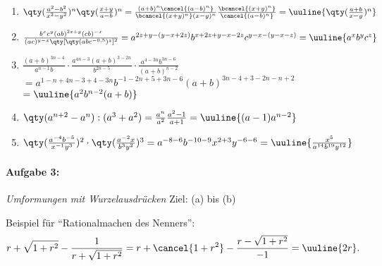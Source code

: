 \begin{enumerate}[label=(\alph*)]
    \item $\qty(\frac{a^2-b^2}{x^2-y^2})^n\qty(\frac{x+y}{a-b})^n = \frac{(a+b)^n \cancel{(a-b)^n}}{\bcancel{(x+y)^n}(x-y)^n} \frac{\bcancel{(x+y)^n}}{\cancel{(a-b)^n}} = \uuline{\qty(\frac{a+b}{x-y})^n}$
    \item $\frac{b^xc^y(ab)^{2z+y}(cb)^{-x}}{(ac)^{y-x}\qty[\qty(abc^{-0,5})^z]^2} = a^{2z + y -(y-x+2z)} b^{x+2z+y-x-2z} c^{y-x-(y-x-z)} = \uuline{a^x b^y c^z}$
    \item $\frac{(a+b)^{3n-4}}{a^{n-1}b}\cdot\frac{a^{4n-3}(a+b)^{3-2n}}{b^{2n-5}}\cdot\frac{a^{4-3n}b^{3n-6}}{(a+b)^{n-2}} $\\
    $= a^{1-n+4n-3+4-3n} b^{-1-2n+5+3n-6} (a+b)^{3n-4+3-2n-n+2} $ \\
    $= \uuline{a^2 b^{n-2}(a+b)}$
    \item $\qty(a^{n+2}-a^n):(a^3+a^2) = \frac{a^n}{a^2}\frac{a^2-1}{a+1} = \uuline{(a-1) a^{n-2}}$
    \item $\qty(\frac{a^{-4}b^{-5}}{x^{-1}y^3})^2\cdot\qty(\frac{a^{-2}x}{b^3y^2})^3 = a^{-8-6} b^{-10-9} x^{2+3} y^{-6-6} = \uuline{\frac{x^5}{a^{14} b^{19} y^{12}}}$
\end{enumerate}
%
\newpage
\paragraph{Aufgabe 3: } \emph{Umformungen mit Wurzelausdrücken} \hfill Ziel: (a) bis (b)\\[0.2cm]

Beispiel für ``Rationalmachen des Nenners'':
\begin{align}
    r + \sqrt{1+r^2} - \frac{1}{r+\sqrt{1+r^2}} = r + \cancel{1+r^2} - \frac{r-\sqrt{1+r^2}}{-1} = \uuline{2r}.
\end{align}


